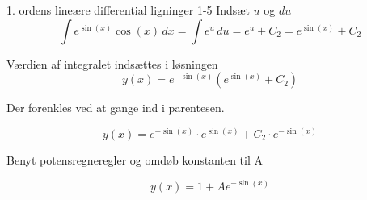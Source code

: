 \documentclass{article}
\begin{document}
\begin{exercise}{1. ordens lineære differential ligninger 1-5}
	\hint 
	Indsæt $u$ og $du$
	\[
	\int e^{\sin(x)} \cos(x) \, dx = \int e^{u} \, du = e^{u} + C_2 = e^{\sin(x)} + C_2
	\]
	
	\hint
	
	Værdien af integralet indsættes i løsningen
	\[
	y(x) = e^{- \sin(x)} \left( e^{\sin(x)}+ C_2\right)
	\]
	
	\hint
	
	Der forenkles ved at gange ind i parentesen.
	
	\hint
	\[
	y(x) = e^{- \sin(x)} \cdot e^{\sin(x)} + C_2 \cdot e^{- \sin(x)} 
	\]
	
	\hint
	
	Benyt potensregneregler og omdøb konstanten til A
	
	\hint
	\[
	y(x) = 1 + A e^{-\sin(x)}
	\]
	
	
\end{exercise}

\newpage
\end{document}
